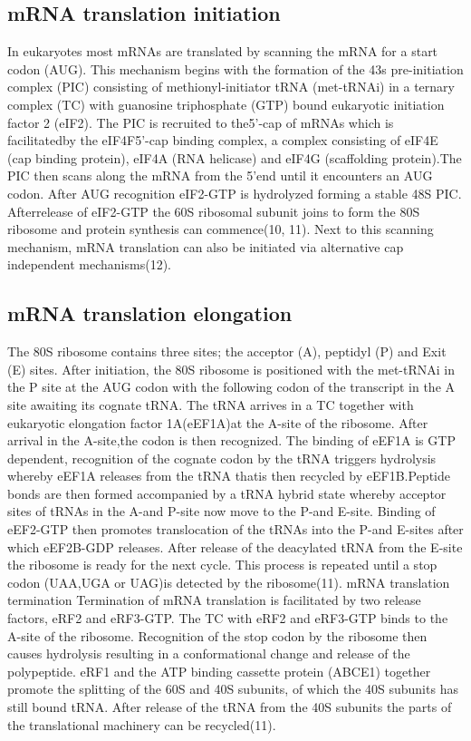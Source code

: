 \documentclass[12pt,openany]{book}
\begin{document}
\subsection{mRNA translation initiation}

In eukaryotes most mRNAs are translated by scanning the mRNA for a start
codon (AUG). This mechanism begins with the formation of the 43s
pre-initiation complex (PIC) consisting of methionyl-initiator tRNA
(met-tRNAi) in a ternary complex (TC) with guanosine triphosphate (GTP)
bound eukaryotic initiation factor 2 (eIF2). The PIC is recruited to
the5'-cap of mRNAs which is facilitatedby the eIF4F5'-cap binding
complex, a complex consisting of eIF4E (cap binding protein), eIF4A (RNA
helicase) and eIF4G (scaffolding protein).The PIC then scans along the
mRNA from the 5'end until it encounters an AUG codon. After AUG
recognition eIF2-GTP is hydrolyzed forming a stable 48S PIC.
Afterrelease of eIF2-GTP the 60S ribosomal subunit joins to form the 80S
ribosome and protein synthesis can commence(10, 11). Next to this
scanning mechanism, mRNA translation can also be initiated via
alternative cap independent mechanisms(12).

\subsection{mRNA translation elongation}

The 80S ribosome contains three sites; the acceptor (A), peptidyl (P)
and Exit (E) sites. After initiation, the 80S ribosome is positioned
with the met-tRNAi in the P site at the AUG codon with the following
codon of the transcript in the A site awaiting its cognate tRNA. The
tRNA arrives in a TC together with eukaryotic elongation factor
1A(eEF1A)at the A-site of the ribosome. After arrival in the A-site,the
codon is then recognized. The binding of eEF1A is GTP dependent,
recognition of the cognate codon by the tRNA triggers hydrolysis whereby
eEF1A releases from the tRNA thatis then recycled by eEF1B.Peptide bonds
are then formed accompanied by a tRNA hybrid state whereby acceptor
sites of tRNAs in the A-and P-site now move to the P-and E-site. Binding
of eEF2-GTP then promotes translocation of the tRNAs into the P-and
E-sites after which eEF2B-GDP releases. After release of the deacylated
tRNA from the E-site the ribosome is ready for the next cycle. This
process is repeated until a stop codon (UAA,UGA or UAG)is detected by
the ribosome(11). mRNA translation termination Termination of mRNA
translation is facilitated by two release factors, eRF2 and eRF3-GTP.
The TC with eRF2 and eRF3-GTP binds to the A-site of the ribosome.
Recognition of the stop codon by the ribosome then causes hydrolysis
resulting in a conformational change and release of the polypeptide.
eRF1 and the ATP binding cassette protein (ABCE1) together promote the
splitting of the 60S and 40S subunits, of which the 40S subunits has
still bound tRNA. After release of the tRNA from the 40S subunits the
parts of the translational machinery can be recycled(11).
\end{document}
